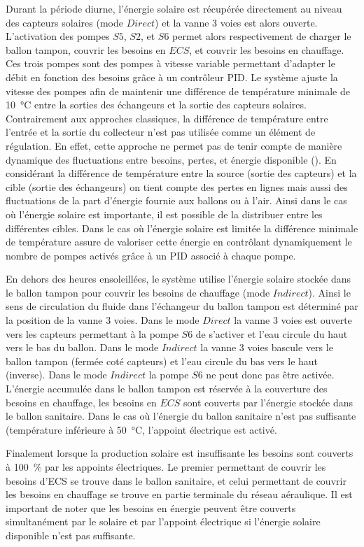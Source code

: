 Durant la période diurne, l’énergie solaire est récupérée directement au niveau des
capteurs solaires (mode $Direct$) et la vanne 3 voies est alors ouverte. L’activation des
pompes $S5$, $S2$, et $S6$ permet alors respectivement de charger le ballon tampon,
couvrir les besoins en $ECS$, et couvrir les besoins en chauffage. Ces trois pompes
sont des pompes à vitesse variable permettant d’adapter le débit en fonction des besoins
grâce à un contrôleur PID. Le système ajuste la vitesse des pompes afin de maintenir une
différence de température minimale de \SI{10}{\celsius} entre la sorties des échangeurs et
la sortie des capteurs solaires. Contrairement aux approches classiques, la différence de
température entre l’entrée et la sortie du collecteur n’est pas utilisée comme un élément
de régulation. En effet, cette approche ne permet pas de tenir compte de manière dynamique
des fluctuations entre besoins, pertes, et énergie disponible ().
En considérant la différence de température entre la source (sortie des capteurs) et la
cible (sortie des échangeurs) on tient compte des pertes en lignes mais aussi des
fluctuations de la part d’énergie fournie aux ballons ou à l’air. Ainsi dans le cas où
l’énergie solaire est importante, il est possible de la distribuer
entre les différentes cibles. Dans le cas où l’énergie solaire est limitée la différence
minimale de température assure de valoriser cette énergie en contrôlant dynamiquement le
nombre de pompes activés grâce à un PID associé à chaque pompe.

En dehors des heures ensoleillées, le système utilise l’énergie solaire stockée dans le
ballon tampon pour couvrir les besoins de chauffage (mode $Indirect$). Ainsi le sens de
circulation du fluide dans l’échangeur du ballon tampon est déterminé par la position de
la vanne 3 voies. Dans le mode $Direct$ la vanne 3 voies est ouverte vers les capteurs
permettant à la pompe $S6$ de s’activer et l’eau circule du haut vers le bas du ballon.
Dans le mode $Indirect$ la vanne 3 voies bascule vers le ballon tampon (fermée coté
capteurs) et l’eau circule du bas vers le haut (inverse). Dans le mode $Indirect$ la pompe
$S6$ ne peut donc pas être activée. L’énergie accumulée dans le ballon tampon est réservée
à la couverture des besoins en chauffage, les besoins en $ECS$ sont couverts par
l’énergie stockée dans le ballon sanitaire. Dans le cas où l’énergie du ballon sanitaire
n’est pas suffisante (température inférieure à \SI{50}{\celsius}, l’appoint électrique est
activé.

Finalement lorsque la production solaire est insuffisante les besoins sont couverts à
\SI{100}{\percent} par les appoints électriques. Le premier permettant de couvrir les
besoins d’ECS se trouve dans le ballon sanitaire, et celui permettant de couvrir les
besoins en chauffage se trouve en partie terminale du réseau aéraulique. Il est important
de noter que les besoins en énergie peuvent être couverts simultanément par
le solaire et par l’appoint électrique si l’énergie solaire disponible n’est pas
suffisante.

